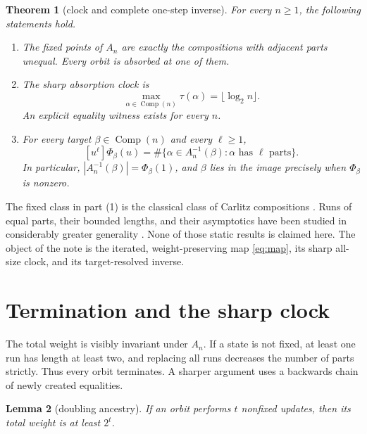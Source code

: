\documentclass[a4paper,10pt]{amsart}
\newtheorem{theorem}{Theorem}
\newtheorem{lemma}[theorem]{Lemma}
\theoremstyle{remark}
\newcommand{\Comp}{\mathop{\mathrm{Comp}}}
\begin{document}
\begin{theorem}[clock and complete one-step inverse]\label{thm:main}
For every $n\ge1$, the following statements hold.
\begin{enumerate}
\item The fixed points of $A_n$ are exactly the compositions with adjacent
parts unequal.  Every orbit is absorbed at one of them.
\item The sharp absorption clock is
\begin{equation}\label{eq:clock}
 \max_{\alpha\in\Comp(n)}\tau(\alpha)=\lfloor\log_2 n\rfloor.
\end{equation}
An explicit equality witness exists for every $n$.
\item For every target $\beta\in\Comp(n)$ and every $\ell\ge1$,
\begin{equation}\label{eq:coefficient}
 [u^\ell]\Phi_\beta(u)
 =\#\{\alpha\in A_n^{-1}(\beta):\text{$\alpha$ has $\ell$ parts}\}.
\end{equation}
In particular, $|A_n^{-1}(\beta)|=\Phi_\beta(1)$, and $\beta$ lies in the
image precisely when $\Phi_\beta$ is nonzero.
\end{enumerate}
\end{theorem}

The fixed class in part (1) is the classical class of Carlitz compositions
\cite{KnopfmacherProdinger1998}.  Runs of equal parts, their bounded lengths,
and their asymptotics have been studied in considerably greater generality
\cite{Wilf2011,Gafni2015,BenderCanfield2009}.  None of those static results is
claimed here.  The object of the note is the iterated, weight-preserving map
\eqref{eq:map}, its sharp all-size clock, and its target-resolved inverse.

\section{Termination and the sharp clock}

The total weight is visibly invariant under $A_n$.  If a state is not fixed,
at least one run has length at least two, and replacing all runs decreases the
number of parts strictly.  Thus every orbit terminates.  A sharper argument
uses a backwards chain of newly created equalities.

\begin{lemma}[doubling ancestry]\label{lem:doubling}
If an orbit performs $t$ nonfixed updates, then its total weight is at least
$2^t$.
\end{lemma}
\end{document}
